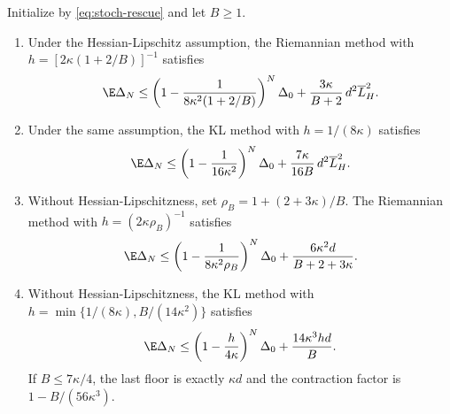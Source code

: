 \begin{theorem}
\label{thm:stoch-global-constant-step}
Initialize by \eqref{eq:stoch-rescue} and let \(B\geq1\).
\begin{enumerate}[label=\textup{(\roman*)}]
\item Under the Hessian-Lipschitz assumption, the Riemannian method with
\(h=[2\kappa(1+2/B)]^{-1}\) satisfies
\begin{equation}
  \E\Delta_N
  \leq
  \left(1-\frac1{8\kappa^2(1+2/B)}\right)^N\Delta_0
  +\frac{3\kappa}{B+2}\,d^2\overline L_H^2.
  \label{eq:stoch-global-riemannian-Hlip}
\end{equation}
\item Under the same assumption, the KL method with
\(h=1/(8\kappa)\) satisfies
\begin{equation}
  \E\Delta_N
  \leq
  \left(1-\frac1{16\kappa^2}\right)^N\Delta_0
  +\frac{7\kappa}{16B}\,d^2\overline L_H^2.
  \label{eq:stoch-global-kl-Hlip}
\end{equation}
\item Without Hessian-Lipschitzness, set
\(\rho_B=1+(2+3\kappa)/B\).  The Riemannian method with
\(h=(2\kappa\rho_B)^{-1}\) satisfies
\begin{equation}
  \E\Delta_N
  \leq
  \left(1-\frac1{8\kappa^2\rho_B}\right)^N\Delta_0
  +\frac{6\kappa^2d}{B+2+3\kappa}.
  \label{eq:stoch-global-riemannian-selfbound}
\end{equation}
\item Without Hessian-Lipschitzness, the KL method with
\(h=\min\{1/(8\kappa),B/(14\kappa^2)\}\) satisfies
\begin{equation}
  \E\Delta_N
  \leq
  \left(1-\frac h{4\kappa}\right)^N\Delta_0
  +\frac{14\kappa^3hd}{B}.
  \label{eq:stoch-global-kl-selfbound}
\end{equation}
If \(B\leq7\kappa/4\), the last floor is exactly \(\kappa d\) and the
contraction factor is \(1-B/(56\kappa^3)\).
\end{enumerate}
\end{theorem}

